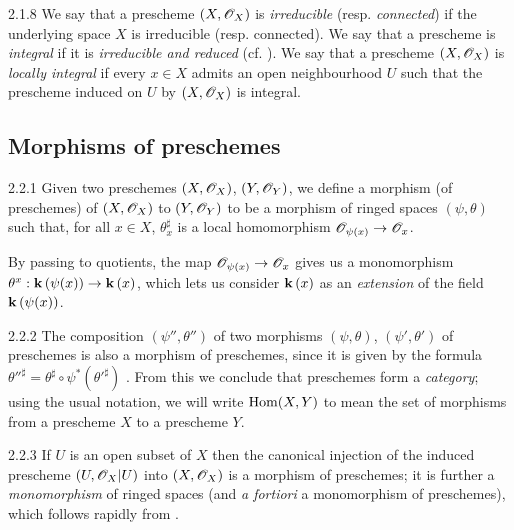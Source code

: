 \begin{env}{2.1.8}
\label{env-1.2.1.8}
We say that a prescheme $(X,\mathscr{O}_X)$ is \emph{irreducible}
(resp. \emph{connected}) if the underlying space $X$ is irreducible (resp.
connected).  We say that a prescheme is \emph{integral} if it is
\emph{irreducible and reduced} (cf. ).  We say that a prescheme
$(X,\mathscr{O}_X)$ is \emph{locally integral} if every $x\in X$ admits an open
neighbourhood $U$ such that the prescheme induced on $U$ by $(X,\mathscr{O}_X)$ is
integral.
\end{env}

\subsection{Morphisms of preschemes}
\label{1-schemes-2.2}

\begin{envs}[Definition]{2.2.1}
\label{defn-1.2.2.1}
Given two preschemes $(X,\mathscr{O}_X)$, $(Y,\mathscr{O}_Y)$, we
define a morphism (of preschemes) of $(X,\mathscr{O}_X)$ to $(Y,\mathscr{O}_Y)$ to be a morphism
of ringed spaces $(\psi,\theta)$ such that, for all $x\in X$, $\theta_x^\sharp$ is a
local homomorphism $\mathscr{O}_{\psi(x)}\to\mathscr{O}_x$.
\end{envs}

By passing to quotients, the map $\mathscr{O}_{\psi(x)}\to\mathscr{O}_x$ gives us a monomorphism
$\theta^x:\mathbf{k}\,(\psi(x))\to\mathbf{k}\,(x)$, which lets us consider $\mathbf{k}\,(x)$ as an
\emph{extension} of the field $\mathbf{k}\,(\psi(x))$.

\begin{env}{2.2.2}
\label{env-1.2.2.2}
The composition $(\psi'',\theta'')$ of two morphisms
$(\psi,\theta)$, $(\psi',\theta')$ of preschemes is also a morphism of
preschemes, since it is given by the formula
${\theta''}^\sharp=\theta^\sharp\circ\psi^*({\theta'}^\sharp)$ . From this
we conclude that preschemes form a \emph{category}; using the usual notation, we
will write ${\mathop{\mathrm{Hom}}\nolimits}(X,Y)$ to mean the set of morphisms from a prescheme $X$ to a
prescheme $Y$.
\end{env}

\begin{env}[Example]{2.2.3}
\label{exm-1.2.2.3}
If $U$ is an open subset of $X$ then the canonical
injection  of the induced prescheme $(U,\mathscr{O}_X|U)$ into
$(X,\mathscr{O}_X)$ is a morphism of preschemes; it is further a \emph{monomorphism} of
ringed spaces (and \emph{a fortiori} a monomorphism of preschemes), which
follows rapidly from .
\end{env}

